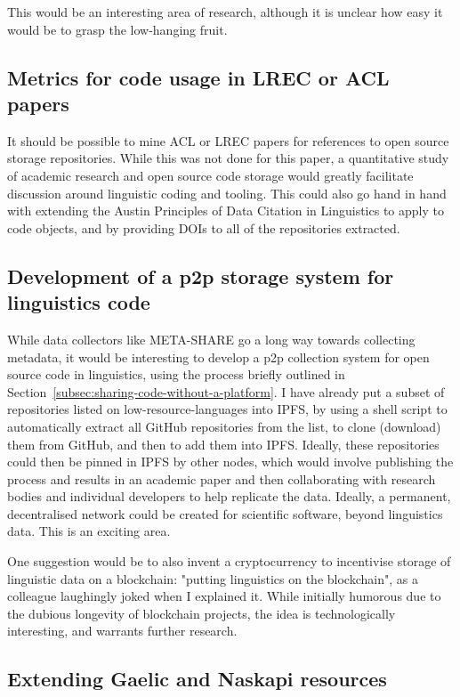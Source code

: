 This would be an interesting area of research, although it is unclear how easy it would be to grasp the low-hanging fruit.

\subsection{Metrics for code usage in LREC or ACL papers}

It should be possible to mine ACL or LREC papers for references to open source storage repositories. While this was not done for this paper, a quantitative study of academic research and open source code storage would greatly facilitate discussion around linguistic coding and tooling. This could also go hand in hand with extending the Austin Principles of Data Citation in Linguistics \citep{AustinPrinciples2017} to apply to code objects, and by providing DOIs to all of the repositories extracted.

\subsection{Development of a p2p storage system for linguistics code}

While data collectors like META-SHARE go a long way towards collecting metadata, it would be interesting to develop a p2p collection system for open source code in linguistics, using the process briefly outlined in Section~\ref{subsec:sharing-code-without-a-platform}. I have already put a subset of repositories listed on low-resource-languages into IPFS, by using a shell script to automatically extract all GitHub repositories from the list, to clone (download) them from GitHub, and then to add them into IPFS. Ideally, these repositories could then be pinned in IPFS by other nodes, which would involve publishing the process and results in an academic paper and then collaborating with research bodies and individual developers to help replicate the data. Ideally, a permanent, decentralised network could be created for scientific software, beyond linguistics data. This is an exciting area.

One suggestion would be to also invent a cryptocurrency to incentivise storage of linguistic data on a blockchain: "putting linguistics on the blockchain", as a colleague laughingly joked when I explained it. While initially humorous due to the dubious longevity of blockchain projects, the idea is technologically interesting, and warrants further research.

\subsection{Extending Gaelic and Naskapi resources}

